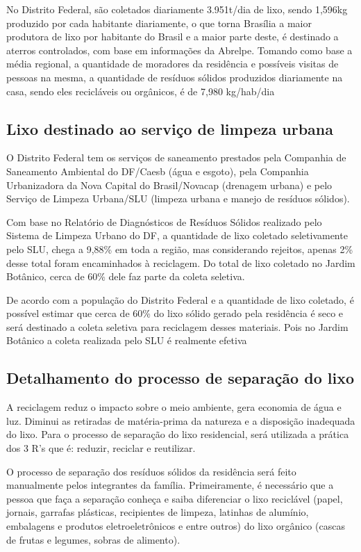 	No Distrito Federal, são coletados diariamente 3.951t/dia de lixo, sendo 1,596kg produzido por cada habitante diariamente, o que torna Brasília a maior produtora de lixo por habitante do Brasil e a maior parte deste, é destinado a aterros controlados, com base em informações da Abrelpe. Tomando como base a média regional, a quantidade de moradores da residência e possíveis visitas de pessoas na mesma, a quantidade de resíduos sólidos produzidos diariamente na casa, sendo eles recicláveis ou orgânicos, é de 7,980 kg/hab/dia

\subsection{Lixo destinado ao serviço de limpeza urbana}

	O Distrito Federal tem os serviços de saneamento prestados pela Companhia de Saneamento Ambiental do DF/Caesb (água e esgoto), pela Companhia Urbanizadora da Nova Capital do Brasil/Novacap (drenagem urbana) e pelo Serviço de Limpeza Urbana/SLU (limpeza urbana e manejo de resíduos sólidos). 

	Com base no Relatório de Diagnósticos de Resíduos Sólidos realizado pelo Sistema de Limpeza Urbano do DF, a quantidade de lixo coletado seletivamente pelo SLU, chega a 9,88\% em toda a região, mas considerando rejeitos, apenas 2\% desse total foram encaminhados à reciclagem. Do total de lixo coletado no Jardim Botânico, cerca de 60\% dele faz parte da coleta seletiva.

	De acordo com a população do Distrito Federal e a quantidade de lixo coletado, é possível estimar que cerca de 60\% do lixo sólido gerado pela residência é seco e será destinado a coleta seletiva para reciclagem desses materiais. Pois no Jardim Botânico a coleta realizada pelo SLU é realmente efetiva

\subsection{Detalhamento do processo de separação do lixo}

	A reciclagem reduz o impacto sobre o meio ambiente, gera economia de água e luz. Diminui as retiradas de matéria-prima da natureza e a disposição inadequada do lixo. Para o processo de separação do lixo residencial, será utilizada a prática dos 3 R's que é: reduzir, reciclar e reutilizar.

	O processo de separação dos resíduos sólidos da residência será feito manualmente pelos integrantes da família. Primeiramente, é necessário que a pessoa que faça a separação conheça e saiba diferenciar o lixo reciclável (papel, jornais, garrafas plásticas, recipientes de limpeza, latinhas de alumínio, embalagens e produtos eletroeletrônicos e entre outros) do lixo orgânico (cascas de frutas e legumes, sobras de alimento).

